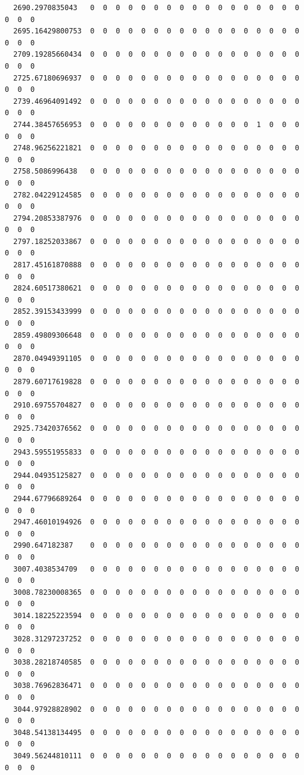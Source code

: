\documentclass[
  letterpaper,
  DIV=11,
  numbers=noendperiod]{scrartcl}
\begin{document}
\begin{verbatim}
  2690.2970835043   0  0  0  0  0  0  0  0  0  0  0  0  0  0  0  0  0  0  0  0
  2695.16429800753  0  0  0  0  0  0  0  0  0  0  0  0  0  0  0  0  0  0  0  0
  2709.19285660434  0  0  0  0  0  0  0  0  0  0  0  0  0  0  0  0  0  0  0  0
  2725.67180696937  0  0  0  0  0  0  0  0  0  0  0  0  0  0  0  0  0  0  0  0
  2739.46964091492  0  0  0  0  0  0  0  0  0  0  0  0  0  0  0  0  0  0  0  0
  2744.38457656953  0  0  0  0  0  0  0  0  0  0  0  0  0  1  0  0  0  0  0  0
  2748.96256221821  0  0  0  0  0  0  0  0  0  0  0  0  0  0  0  0  0  0  0  0
  2758.5086996438   0  0  0  0  0  0  0  0  0  0  0  0  0  0  0  0  0  0  0  0
  2782.04229124585  0  0  0  0  0  0  0  0  0  0  0  0  0  0  0  0  0  0  0  0
  2794.20853387976  0  0  0  0  0  0  0  0  0  0  0  0  0  0  0  0  0  0  0  0
  2797.18252033867  0  0  0  0  0  0  0  0  0  0  0  0  0  0  0  0  0  0  0  0
  2817.45161870888  0  0  0  0  0  0  0  0  0  0  0  0  0  0  0  0  0  0  0  0
  2824.60517380621  0  0  0  0  0  0  0  0  0  0  0  0  0  0  0  0  0  0  0  0
  2852.39153433999  0  0  0  0  0  0  0  0  0  0  0  0  0  0  0  0  0  0  0  0
  2859.49809306648  0  0  0  0  0  0  0  0  0  0  0  0  0  0  0  0  0  0  0  0
  2870.04949391105  0  0  0  0  0  0  0  0  0  0  0  0  0  0  0  0  0  0  0  0
  2879.60717619828  0  0  0  0  0  0  0  0  0  0  0  0  0  0  0  0  0  0  0  0
  2910.69755704827  0  0  0  0  0  0  0  0  0  0  0  0  0  0  0  0  0  0  0  0
  2925.73420376562  0  0  0  0  0  0  0  0  0  0  0  0  0  0  0  0  0  0  0  0
  2943.59551955833  0  0  0  0  0  0  0  0  0  0  0  0  0  0  0  0  0  0  0  0
  2944.04935125827  0  0  0  0  0  0  0  0  0  0  0  0  0  0  0  0  0  0  0  0
  2944.67796689264  0  0  0  0  0  0  0  0  0  0  0  0  0  0  0  0  0  0  0  0
  2947.46010194926  0  0  0  0  0  0  0  0  0  0  0  0  0  0  0  0  0  0  0  0
  2990.647182387    0  0  0  0  0  0  0  0  0  0  0  0  0  0  0  0  0  0  0  0
  3007.4038534709   0  0  0  0  0  0  0  0  0  0  0  0  0  0  0  0  0  0  0  0
  3008.78230008365  0  0  0  0  0  0  0  0  0  0  0  0  0  0  0  0  0  0  0  0
  3014.18225223594  0  0  0  0  0  0  0  0  0  0  0  0  0  0  0  0  0  0  0  0
  3028.31297237252  0  0  0  0  0  0  0  0  0  0  0  0  0  0  0  0  0  0  0  0
  3038.28218740585  0  0  0  0  0  0  0  0  0  0  0  0  0  0  0  0  0  0  0  0
  3038.76962836471  0  0  0  0  0  0  0  0  0  0  0  0  0  0  0  0  0  0  0  0
  3044.97928828902  0  0  0  0  0  0  0  0  0  0  0  0  0  0  0  0  0  0  0  0
  3048.54138134495  0  0  0  0  0  0  0  0  0  0  0  0  0  0  0  0  0  0  0  0
  3049.56244810111  0  0  0  0  0  0  0  0  0  0  0  0  0  0  0  0  0  0  0  0

\end{verbatim}
\end{document}
